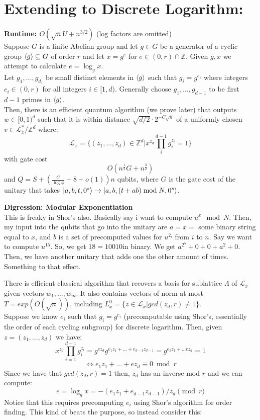 \documentclass{article}
\begin{document}
\section{Extending to Discrete Logarithm:}
\textbf{Runtime: $O(\sqrt{n} U + n^{3/2})$} (log factors are omitted)\\

Suppose $G$ is a finite Abelian group and let $g\in G$ be a generator of a cyclic group $\braket{g} \subseteq G$ of order $r$ and let $x = g^e$ for $e \in (0,r)\cap \mathbb{Z}$. Given $g,x$ we attempt to calculate $e = \log_g x$.\\
Let $g_1, \dots, g_{d_1}$ be small distinct elements in $\braket{g}$ such that $g_i = g^{e_i}$ where integers $e_i \in (0,r)$ for all integers $i \in [1,d)$. Generally choose $g_1, \dots, g_{d-1}$ to be first $d-1$ primes in $\braket{g}$. \\
Then, there is an efficient quantum algorithm (we prove later) that outputs $w\in [0,1)^d$ such that it is within distance $\sqrt{d/2} \cdot 2^{-C\sqrt{n}}$ of a uniformly chosen $v \in \mathcal{L}_{x}^{*}/ \mathbb{Z}^d$ where:
$$\mathcal{L}_x = \{ (z_1, \dots, z_d) \in \mathbb{Z}^d | x^{z_d} \prod_{i}^{d-1} g_{i}^{z_i} = 1\}$$
with gate cost $$O(n^\frac12 G + n^{\frac{3}{2}})$$
and $Q = S + (\frac{C}{\log \phi} + 8 + o(1))n$ qubits, where $G$ is the gate cost of the unitary that takes $\ket{a,b,t, 0^s} \to \ket{a,b, (t+ab) \bmod N, 0^s}$.
\begin{tcolorbox}\textbf{Digression: Modular Exponentiation}\\
	This is freaky in Shor's also. Basically say i want to compute $u^x \mod N$. Then, my input into the qubits that go into the unitary are $a = x =$ some binary string equal to $x$, and $b$ is a set of precomputed values for $u^{2_i}$ from $i$ to $n$. Say we want to compute $u^15$. So, we get $18 = 10010$in binary. We get $a^{2^5} + 0 + 0 + a^2 + 0$. Then, we have another unitary that adds one the other amount of times. Something to that effect.
\end{tcolorbox}
There is efficient classical algorithm that recovers a basis for sublattice $\Lambda$ of $\mathcal{L}_x$ given vectors $w_1, \dots, w_m$. It also contains vectors of norm at most $T=exp(O(\sqrt{n}))$, including $L_{x}^{0} = \{z \in \mathcal{L}_x | gcd(z_d,r) \neq 1\}$.\\
Suppose we know $e_i$ such that $g_i = g^{e_i}$ (precomputable using Shor's, essentially the order of each cycling subgroup) for discrete logarithm. Then, given $z = (z_1, \dots, z_d)$ we have:
$$x^{z_d} \prod_{i=1}^{d-1} g_{i}^{z_i} = g^{e z_d} g^{e_1 z_1 + \dots + e_{d-1}z_{d-1}} = g^{e_1 z_1 + \dots e z_d} = 1$$
$$\iff e_1 z_1 + \dots + e z_d \equiv 0 \bmod r$$
Since we have that $gcd(z_d,r)=1$ then, $z_d$ has an inverse mod $r$ and we can compute:
$$e = \log_g x = - (e_1 z_1 + e_{d-1} z_{d-1})/z_d \pmod r$$
Notice that this requires precomputing $e_i$ using Shor's algorithm for order finding. This kind of beats the purpose, so instead consider this:
\end{document}
